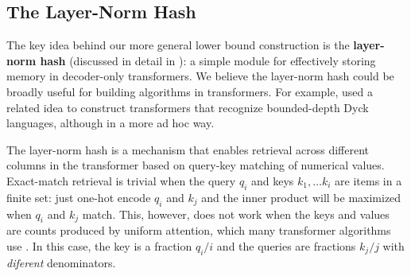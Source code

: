 \documentclass{article}
\begin{document}
\subsection{The Layer-Norm Hash}

The key idea behind our more general lower bound construction is the \textbf{layer-norm hash} (discussed in detail in ): a simple module for effectively storing memory in decoder-only transformers.
We believe the layer-norm hash could be broadly useful for building algorithms in transformers.
For example, \citet{yao2021self} used a related idea to construct transformers that recognize bounded-depth Dyck languages, although in a more ad hoc way.

The layer-norm hash is a mechanism that enables retrieval across different columns in the transformer based on query-key matching of numerical values.
Exact-match retrieval is trivial when the query $q_i$ and keys $k_1, \ldots k_i$ are items in a finite set: just one-hot encode $q_i$ and $k_j$ and the inner product will be maximized when $q_i$ and $k_j$ match.
This, however, does not work when the keys and values are counts produced by uniform attention, which many transformer algorithms use \citep{weiss2021thinking}.
In this case, the key is a fraction $q_i/i$ and the queries are fractions $k_j/j$ with \emph{diferent} denominators.
\end{document}

